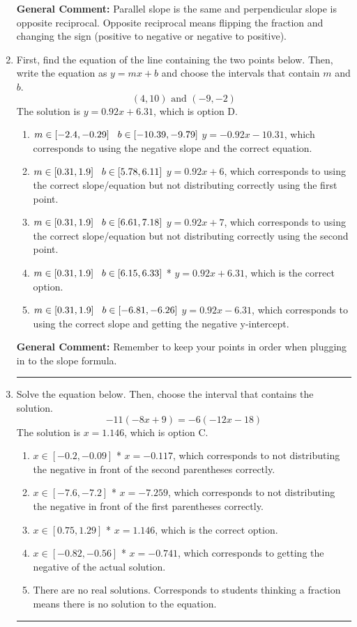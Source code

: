 \documentclass{extbook}[14pt]
\newcommand{\litem}[1]{\item #1

\rule{\textwidth}{0.4pt}}
\begin{document}
\begin{enumerate}
{\textbf{General Comment:} Parallel slope is the same and perpendicular slope is opposite reciprocal. Opposite reciprocal means flipping the fraction and changing the sign (positive to negative or negative to positive).
}
\litem{
First, find the equation of the line containing the two points below. Then, write the equation as $ y=mx+b $ and choose the intervals that contain $m$ and $b$.
\[ (4, 10) \text{ and } (-9, -2) \]
The solution is \( y = 0.92x + 6.31 \), which is option D.\begin{enumerate}[label=\Alph*.]
\item \( m \in [-2.4, -0.29] \hspace*{3mm} b \in [-10.39, -9.79] \)
 $y = -0.92x -10.31$, which corresponds to using the negative slope and the correct equation.
\item \( m \in [0.31, 1.9] \hspace*{3mm} b \in [5.78, 6.11] \)
 $y = 0.92x + 6$, which corresponds to using the correct slope/equation but not distributing correctly using the first point.
\item \( m \in [0.31, 1.9] \hspace*{3mm} b \in [6.61, 7.18] \)
 $y = 0.92x + 7$, which corresponds to using the correct slope/equation but not distributing correctly using the second point.
\item \( m \in [0.31, 1.9] \hspace*{3mm} b \in [6.15, 6.33] \)
* $y = 0.92x + 6.31$, which is the correct option.
\item \( m \in [0.31, 1.9] \hspace*{3mm} b \in [-6.81, -6.26] \)
 $y = 0.92x -6.31$, which corresponds to using the correct slope and getting the negative y-intercept.
\end{enumerate}

\textbf{General Comment:} Remember to keep your points in order when plugging in to the slope formula.
}
\litem{
Solve the equation below. Then, choose the interval that contains the solution.
\[ -11(-8x + 9) = -6(-12x -18) \]
The solution is \( x = 1.146 \), which is option C.\begin{enumerate}[label=\Alph*.]
\item \( x \in [-0.2, -0.09] \)
* $x = -0.117$, which corresponds to not distributing the negative in front of the second parentheses correctly.
\item \( x \in [-7.6, -7.2] \)
* $x = -7.259$, which corresponds to not distributing the negative in front of the first parentheses correctly.
\item \( x \in [0.75, 1.29] \)
* $x = 1.146$, which is the correct option.
\item \( x \in [-0.82, -0.56] \)
* $x = -0.741$, which corresponds to getting the negative of the actual solution.
\item \( \text{There are no real solutions.} \)
Corresponds to students thinking a fraction means there is no solution to the equation.
\end{enumerate}

}
\end{enumerate}
\end{document}
